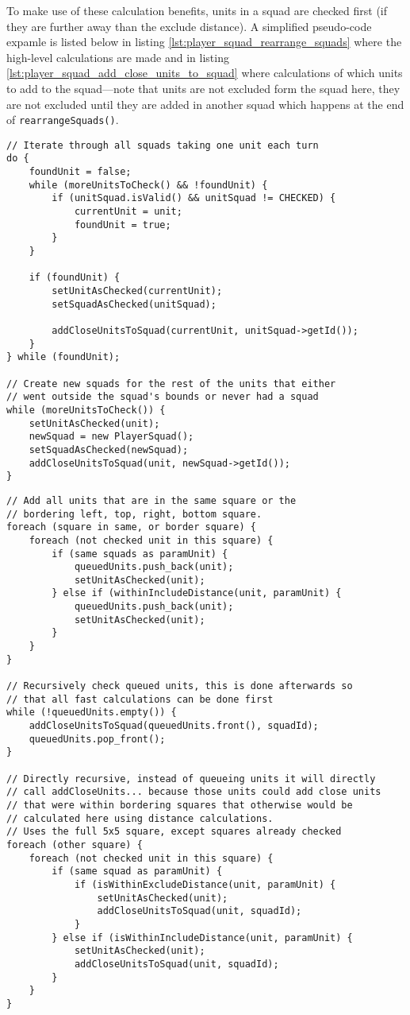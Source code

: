 To make use of these calculation benefits, units in a squad are checked first (if they are further away than the exclude distance). A simplified pseudo-code expamle is listed below in listing \ref{lst:player_squad_rearrange_squads} where the high-level calculations are made and in listing \ref{lst:player_squad_add_close_units_to_squad} where calculations of which units to add to the squad—note that units are not excluded form the squad here, they are not excluded until they are added in another squad which happens at the end of \texttt{rearrangeSquads()}.

\begin{lstlisting}[label={lst:player_squad_rearrange_squads},caption={Pseudo-code of \texttt{rearrangeSquads()}.}]
// Iterate through all squads taking one unit each turn
do {
	foundUnit = false;
	while (moreUnitsToCheck() && !foundUnit) {
		if (unitSquad.isValid() && unitSquad != CHECKED) {
			currentUnit = unit;
			foundUnit = true;
		}
	}
	
	if (foundUnit) {
		setUnitAsChecked(currentUnit);
		setSquadAsChecked(unitSquad);
		
		addCloseUnitsToSquad(currentUnit, unitSquad->getId());
	}
} while (foundUnit);

// Create new squads for the rest of the units that either
// went outside the squad's bounds or never had a squad
while (moreUnitsToCheck()) {
	setUnitAsChecked(unit);
	newSquad = new PlayerSquad();
	setSquadAsChecked(newSquad);
	addCloseUnitsToSquad(unit, newSquad->getId());
}
\end{lstlisting}

\begin{lstlisting}[label={lst:player_squad_add_close_units_to_squad},caption={Pseudo-code of \texttt{addCloseUnitsToSquad()}}]
// Add all units that are in the same square or the
// bordering left, top, right, bottom square.
foreach (square in same, or border square) {
	foreach (not checked unit in this square) {
		if (same squads as paramUnit) {
			queuedUnits.push_back(unit);
			setUnitAsChecked(unit);
		} else if (withinIncludeDistance(unit, paramUnit) {
			queuedUnits.push_back(unit);
			setUnitAsChecked(unit);
		}
	}
}

// Recursively check queued units, this is done afterwards so
// that all fast calculations can be done first
while (!queuedUnits.empty()) {
	addCloseUnitsToSquad(queuedUnits.front(), squadId);
	queuedUnits.pop_front();
}

// Directly recursive, instead of queueing units it will directly
// call addCloseUnits... because those units could add close units
// that were within bordering squares that otherwise would be
// calculated here using distance calculations.
// Uses the full 5x5 square, except squares already checked
foreach (other square) {
	foreach (not checked unit in this square) {
		if (same squad as paramUnit) {
			if (isWithinExcludeDistance(unit, paramUnit) {
				setUnitAsChecked(unit);
				addCloseUnitsToSquad(unit, squadId);
			}
		} else if (isWithinIncludeDistance(unit, paramUnit) {
			setUnitAsChecked(unit);
			addCloseUnitsToSquad(unit, squadId);
		}
	}
}
\end{lstlisting}


